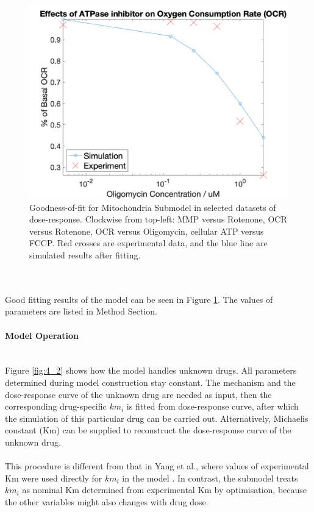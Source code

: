 \documentclass[12pt]{article}
\newcommand{\myparagraph}[1]{\paragraph{#1}\mbox{}\\}
\begin{document}
\begin{figure}[ht]
\begin{minipage}[b]{0.5\linewidth}
  \end{minipage}%
  \begin{minipage}[b]{0.5\linewidth}
    \centering
    \includegraphics[width=\linewidth]{atpase_ocr.png} 
  \end{minipage} 
  \caption{Goodness-of-fit for Mitochondria Submodel in selected datasets of dose-response. Clockwise from top-left: MMP versus Rotenone, OCR versus Rotenone, OCR versus Oligomycin, cellular ATP versus FCCP. Red crosses are experimental data, and the blue line are simulated results after fitting.}
  \label{fig:quad_mito}
  \end{figure}\\\\Good fitting results of the model can be seen in Figure \ref{fig:quad_mito}. The values of parameters are listed in Method Section.
\myparagraph{Model Operation}
Figure \ref{fig:4_2} shows how the model handles unknown drugs. All parameters determined during model construction stay constant. The mechanism and the dose-response curve of the unknown drug are needed as input, then the corresponding drug-specific $km_i$ is fitted from dose-response curve, after which the simulation of this particular drug can be carried out. Alternatively, Michaelis constant (Km) can be supplied to reconstruct the dose-response curve of the unknown drug. \\\\
This procedure is different from that in Yang et al., where values of experimental Km were used directly for $km_i$ in the model \cite{y.yangMITOsymMechanisticMathematical2015}. In contrast, the submodel treats $km_i$ as nominal Km determined from experimental Km by optimisation, because the other variables might also changes with drug dose.
\end{document}

